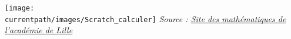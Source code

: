 \begin{enigme}
    \begin{changemargin}{-10mm}{-10mm}
        \texttt{[image: \\currentpath/images/Scratch\_calculer]}
        \vfill\hfill {\it\footnotesize Source : \href{http://joly.vince.free.fr/Manuel_Algo/Scratch_Calculer.pdf}{Site des mathématiques de l'académie de Lille }}
    \end{changemargin}
\end{enigme}


 
